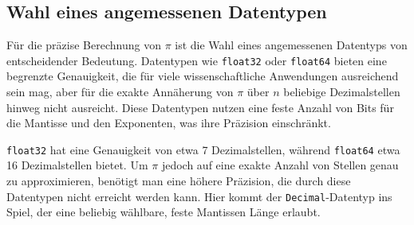 \documentclass{scrartcl}
\theoremstyle{definition}
\newtheorem{approximation sequence}{Annäherungsfolge}
\begin{document}
%
%

\subsection{Wahl eines angemessenen Datentypen}

Für die präzise Berechnung von \(\pi\) ist die Wahl eines angemessenen
Datentyps von entscheidender Bedeutung. Datentypen wie \texttt{float32} oder
\texttt{float64} bieten eine begrenzte Genauigkeit, die für viele
wissenschaftliche Anwendungen ausreichend sein mag, aber für die exakte
Annäherung von \(\pi\) über \(n\) beliebige Dezimalstellen hinweg nicht
ausreicht.
Diese Datentypen nutzen eine feste Anzahl von Bits für die Mantisse und den
Exponenten, was ihre Präzision einschränkt.

\texttt{float32} hat eine Genauigkeit von etwa 7 Dezimalstellen, während
\texttt{float64} etwa 16 Dezimalstellen bietet.
Um \(\pi\) jedoch auf eine exakte Anzahl von Stellen genau zu approximieren,
benötigt man eine höhere Präzision, die durch diese Datentypen nicht erreicht
werden kann.
Hier kommt der \texttt{Decimal}-Datentyp ins Spiel, der eine beliebig wählbare,
feste Mantissen Länge erlaubt.
\end{document}
